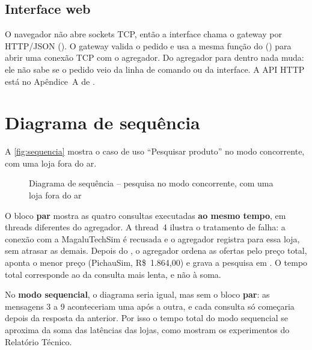 \section{Interface web}

O navegador não abre sockets TCP, então a interface chama o gateway por HTTP/JSON (). O gateway valida o pedido e usa a mesma função do  () para abrir uma conexão TCP com o agregador. Do agregador para dentro nada muda: ele não sabe se o pedido veio da linha de comando ou da interface. A API HTTP está no Apêndice~A de .

\chapter{Diagrama de sequência}

A \autoref{fig:sequencia} mostra o caso de uso ``Pesquisar produto'' no modo concorrente, com uma loja fora do ar.

\begin{figure}[!htbp]
  \centering
  \caption{Diagrama de sequência -- pesquisa no modo concorrente, com uma loja fora do ar}\label{fig:sequencia}
  \fonteautores
\end{figure}

O bloco \textbf{par} mostra as quatro consultas executadas \textbf{ao mesmo tempo}, em threads diferentes do agregador. A thread~4 ilustra o tratamento de falha: a conexão com a MagaluTechSim é recusada e o agregador registra  para essa loja, sem atrasar as demais. Depois do , o agregador ordena as ofertas pelo preço total, aponta o menor preço (PichauSim, R\$~1.864,00) e grava a pesquisa em . O tempo total corresponde ao da consulta mais lenta, e não à soma.

No \textbf{modo sequencial}, o diagrama seria igual, mas sem o bloco \textbf{par}: as mensagens 3 a 9 aconteceriam uma após a outra, e cada consulta só começaria depois da resposta da anterior. Por isso o tempo total do modo sequencial se aproxima da soma das latências das lojas, como mostram os experimentos do Relatório Técnico.

\postextual



